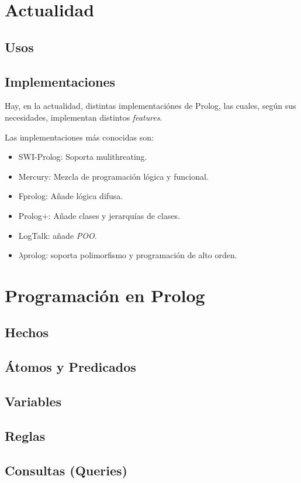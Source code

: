 \documentclass{article}
\begin{document}
\newpage
\section{Actualidad}
\subsection{Usos}
\subsection{Implementaciones}

Hay, en la actualidad, distintas implementaciónes de Prolog, las cuales, según sus necesidades, implementan distintos \textit{features}.

Las implementaciones más conocidas son:
\begin{itemize}
    \item SWI-Prolog: Soporta mulithreating.
    \item Mercury: Mezcla de programación lógica y funcional.
    \item Fprolog: Añade lógica difusa.
    \item Prolog+: Añade clases y jerarquías de clases.
    \item LogTalk: añade \textit{POO}.
    \item $\lambda$prolog: soporta polimorfismo y programación de alto orden.
\end{itemize}

\newpage
\section{Programación en Prolog}
\subsection{Hechos}
\subsection{Átomos y Predicados}
\subsection{Variables}
\subsection{Reglas}
\subsection{Consultas (Queries)}
\end{document}
